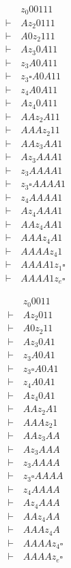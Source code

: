 \documentclass[10pt,a4paper]{article}
\begin{document}
\begin{align*}
  &\, z_{0}00111\\
  \vdash &\, Az_{2}0111\\
  \vdash &\, A0z_{2}111\\
  \vdash &\, Az_{3}0A11\\
  \vdash &\, z_{3}A0A11\\
  \vdash &\, z_{3}\square A0A11\\
  \vdash &\, z_{4}A0A11\\
  \vdash &\, Az_{4}0A11\\
  \vdash &\, AAz_{2}A11\\
  \vdash &\, AAAz_{2}11\\
  \vdash &\, AAz_{3}AA1\\
  \vdash &\, Az_{3}AAA1\\
  \vdash &\, z_{3}AAAA1\\
  \vdash &\, z_{3} \square AAAA1\\
  \vdash &\, z_{4}AAAA1\\
  \vdash &\, Az_{4}AAA1\\
  \vdash &\, AAz_{4}AA1\\
  \vdash &\, AAAz_{4}A1\\
  \vdash &\, AAAAz_{4}1\\
  \vdash &\, AAAA1z_{1}\square\\
  \vdash &\, AAAA1z_{e}\square
\end{align*}

\begin{align*}
  &\, z_{0}0011\\
  \vdash &\, Az_{2}011\\
  \vdash &\, A0z_{2}11\\
  \vdash &\, Az_{3}0A1\\
  \vdash &\, z_{3}A0A1\\
  \vdash &\, z_{3}\square A0A1\\
  \vdash &\, z_{4}A0A1\\
  \vdash &\, Az_{4}0A1\\
  \vdash &\, AAz_{2}A1\\
  \vdash &\, AAAz_{2}1\\
  \vdash &\, AAz_{3}AA\\
  \vdash &\, Az_{3}AAA\\
  \vdash &\, z_{3}AAAA\\
  \vdash &\, z_{3} \square AAAA\\
  \vdash &\, z_{4}AAAA\\
  \vdash &\, Az_{4}AAA\\
  \vdash &\, AAz_{4}AA\\
  \vdash &\, AAAz_{4}A\\
  \vdash &\, AAAAz_{4} \square\\
  \vdash &\, AAAAz_{e} \square
\end{align*}
\end{document}
